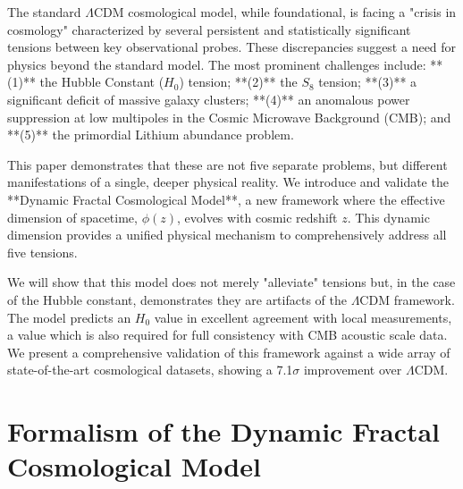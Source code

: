 \documentclass[aps,prl,twocolumn,groupedaddress]{revtex4-2}
\begin{document}
The standard $\Lambda$CDM cosmological model, while foundational, is facing a "crisis in cosmology" characterized by several persistent and statistically significant tensions between key observational probes. These discrepancies suggest a need for physics beyond the standard model. The most prominent challenges include: **(1)** the Hubble Constant ($H_0$) tension; **(2)** the $S_8$ tension; **(3)** a significant deficit of massive galaxy clusters; **(4)** an anomalous power suppression at low multipoles in the Cosmic Microwave Background (CMB); and **(5)** the primordial Lithium abundance problem.

This paper demonstrates that these are not five separate problems, but different manifestations of a single, deeper physical reality. We introduce and validate the **Dynamic Fractal Cosmological Model**, a new framework where the effective dimension of spacetime, $\phi(z)$, evolves with cosmic redshift $z$. This dynamic dimension provides a unified physical mechanism to comprehensively address all five tensions.

We will show that this model does not merely "alleviate" tensions but, in the case of the Hubble constant, demonstrates they are artifacts of the $\Lambda$CDM framework. The model predicts an $H_0$ value in excellent agreement with local measurements, a value which is also required for full consistency with CMB acoustic scale data. We present a comprehensive validation of this framework against a wide array of state-of-the-art cosmological datasets, showing a 7.1$\sigma$ improvement over $\Lambda$CDM.

\section{Formalism of the Dynamic Fractal Cosmological Model}
\end{document}
